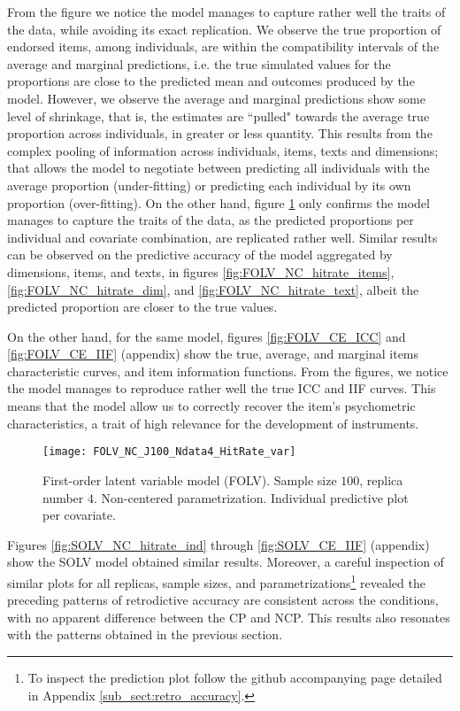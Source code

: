 From the figure we notice the model manages to capture rather well the traits of the data, while avoiding its exact replication. We observe the true proportion of endorsed items, among individuals, are within the compatibility intervals of the average and marginal predictions, i.e. the true simulated values for the proportions are close to the predicted mean and outcomes produced by the model. However, we observe the average and marginal predictions show some level of shrinkage, that is, the estimates are ``pulled" towards the average true proportion across individuals, in greater or less quantity. This results from the complex pooling of information across individuals, items, texts and dimensions; that allows the model to negotiate between predicting all individuals with the average proportion (under-fitting) or predicting each individual by its own proportion (over-fitting). On the other hand, figure \ref{fig:FOLV_NC_hitrate_var} only confirms the model manages to capture the traits of the data, as the predicted proportions per individual and covariate combination, are replicated rather well. Similar results can be observed on the predictive accuracy of the model aggregated by dimensions, items, and texts, in figures \ref{fig:FOLV_NC_hitrate_items}, \ref{fig:FOLV_NC_hitrate_dim}, and \ref{fig:FOLV_NC_hitrate_text}, albeit the predicted proportion are closer to the true values.

On the other hand, for the same model, figures \ref{fig:FOLV_CE_ICC} and \ref{fig:FOLV_CE_IIF} (appendix) show the true, average, and marginal items characteristic curves, and item information functions. From the figures, we notice the model manages to reproduce rather well the true ICC and IIF curves. This means that the model allow us to correctly recover the item's psychometric characteristics, a trait of high relevance for the development of instruments.
%
\begin{figure}[H]
	\centering
	\texttt{[image: FOLV\_NC\_J100\_Ndata4\_HitRate\_var]}
	\caption[First-order latent variable model (FOLV). Sample size $100$, replica number $4$. Non-centered parametrization. Individual predictive plot per covariate.]%
	{First-order latent variable model (FOLV). Sample size $100$, replica number $4$. Non-centered parametrization. Individual predictive plot per covariate.}
	\label{fig:FOLV_NC_hitrate_var}
\end{figure}

Figures \ref{fig:SOLV_NC_hitrate_ind} through \ref{fig:SOLV_CE_IIF} (appendix) show the SOLV model obtained similar results. Moreover, a careful inspection of similar plots for all replicas, sample sizes, and parametrizations\footnote{To inspect the prediction plot follow the github accompanying page detailed in Appendix \ref{sub_sect:retro_accuracy}.} revealed the preceding patterns of retrodictive accuracy are consistent across the conditions, with no apparent difference between the CP and NCP. This results also resonates with the patterns obtained in the previous section.

